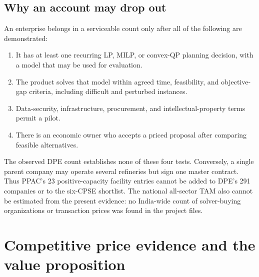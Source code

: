\documentclass[11pt,a4paper]{article}
\begin{document}
\subsection{Why an account may drop out}

An enterprise belongs in a serviceable count only after all of the following are demonstrated:
\begin{enumerate}
  \item It has at least one recurring LP, MILP, or convex-QP planning decision, with a model that may be used for evaluation.
  \item The product solves that model within agreed time, feasibility, and objective-gap criteria, including difficult and perturbed instances.
  \item Data-security, infrastructure, procurement, and intellectual-property terms permit a pilot.
  \item There is an economic owner who accepts a priced proposal after comparing feasible alternatives.
\end{enumerate}
The observed DPE count establishes none of these four tests. Conversely, a single parent company may operate several refineries but sign one master contract. Thus PPAC's 23 positive-capacity facility entries cannot be added to DPE's 291 companies or to the six-CPSE shortlist. The national all-sector TAM also cannot be estimated from the present evidence: no India-wide count of solver-buying organizations or transaction prices was found in the project files.

\section{Competitive price evidence and the value proposition}
\end{document}
